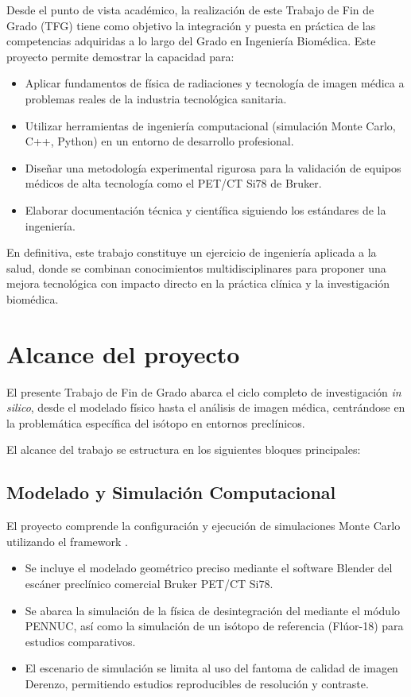 Desde el punto de vista académico, la realización de este Trabajo de Fin de Grado (TFG) tiene como objetivo la integración y
puesta en práctica de las competencias adquiridas a lo largo del Grado en Ingeniería Biomédica. Este proyecto permite demostrar
la capacidad para:

\begin{itemize}
	\item Aplicar fundamentos de física de radiaciones y tecnología de imagen médica a problemas reales de la industria tecnológica sanitaria.
	\item Utilizar herramientas de ingeniería computacional (simulación Monte Carlo, C++, Python) en un entorno de desarrollo profesional.
	\item Diseñar una metodología experimental rigurosa para la validación de equipos médicos de alta tecnología como el PET/CT Si78 de Bruker.
	\item Elaborar documentación técnica y científica siguiendo los estándares de la ingeniería.
\end{itemize}

En definitiva, este trabajo constituye un ejercicio de ingeniería aplicada a la salud, donde se combinan conocimientos
multidisciplinares para proponer una mejora tecnológica con impacto directo en la práctica clínica y la investigación biomédica.

\section{Alcance del proyecto}
\label{sec:introduccion:alcance}

El presente Trabajo de Fin de Grado abarca el ciclo completo de investigación \textit{in silico}, desde el modelado físico hasta
el análisis de imagen médica, centrándose en la problemática específica del isótopo \yochoseis en entornos
preclínicos.

El alcance del trabajo se estructura en los siguientes bloques principales:

\subsection{Modelado y Simulación Computacional}
El proyecto comprende la configuración y ejecución de simulaciones Monte Carlo utilizando el framework \penred.

\begin{itemize}
	\item Se incluye el modelado geométrico preciso mediante el software Blender del escáner preclínico comercial Bruker PET/CT Si78.
	\item Se abarca la simulación de la física de desintegración del \yochoseis mediante el módulo PENNUC, así como la simulación de un isótopo de referencia (Flúor-18) para estudios comparativos.
	\item El escenario de simulación se limita al uso del fantoma de calidad de imagen Derenzo, permitiendo estudios reproducibles de resolución y contraste.
\end{itemize}


